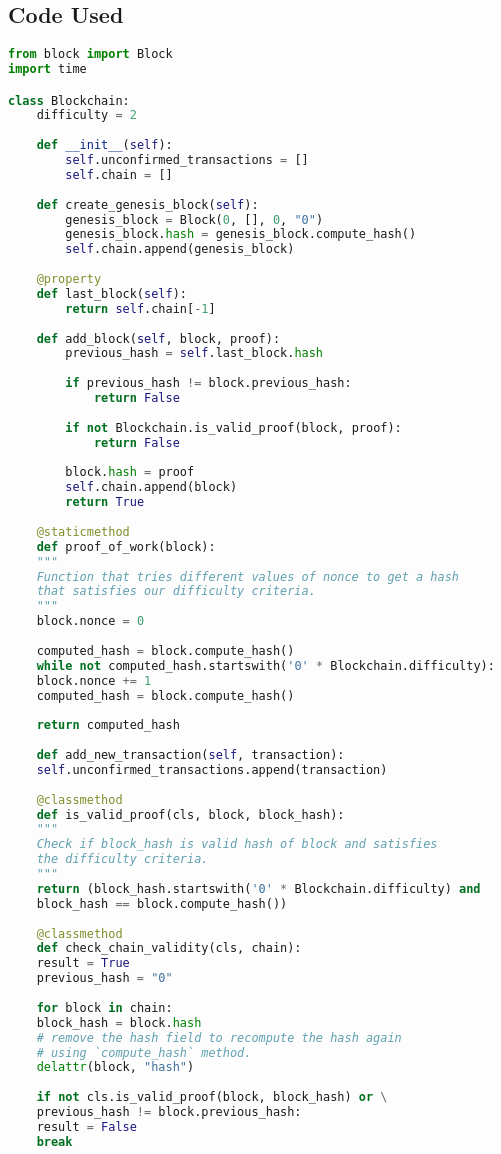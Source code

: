 \documentclass{article}
\begin{document}
\subsection{Code Used}
\begin{lstlisting}[language=Python]
from block import Block
import time

class Blockchain:
	difficulty = 2
	
	def __init__(self):
		self.unconfirmed_transactions = []
		self.chain = []
	
	def create_genesis_block(self):
		genesis_block = Block(0, [], 0, "0")
		genesis_block.hash = genesis_block.compute_hash()
		self.chain.append(genesis_block)
	
	@property
	def last_block(self):
		return self.chain[-1]
	
	def add_block(self, block, proof):
		previous_hash = self.last_block.hash
		
		if previous_hash != block.previous_hash:
			return False
		
		if not Blockchain.is_valid_proof(block, proof):
			return False
		
		block.hash = proof
		self.chain.append(block)
		return True
	
	@staticmethod
	def proof_of_work(block):
	"""
	Function that tries different values of nonce to get a hash
	that satisfies our difficulty criteria.
	"""
	block.nonce = 0
	
	computed_hash = block.compute_hash()
	while not computed_hash.startswith('0' * Blockchain.difficulty):
	block.nonce += 1
	computed_hash = block.compute_hash()
	
	return computed_hash
	
	def add_new_transaction(self, transaction):
	self.unconfirmed_transactions.append(transaction)
	
	@classmethod
	def is_valid_proof(cls, block, block_hash):
	"""
	Check if block_hash is valid hash of block and satisfies
	the difficulty criteria.
	"""
	return (block_hash.startswith('0' * Blockchain.difficulty) and
	block_hash == block.compute_hash())
	
	@classmethod
	def check_chain_validity(cls, chain):
	result = True
	previous_hash = "0"
	
	for block in chain:
	block_hash = block.hash
	# remove the hash field to recompute the hash again
	# using `compute_hash` method.
	delattr(block, "hash")
	
	if not cls.is_valid_proof(block, block_hash) or \
	previous_hash != block.previous_hash:
	result = False
	break
	

\end{lstlisting}
\end{document}
